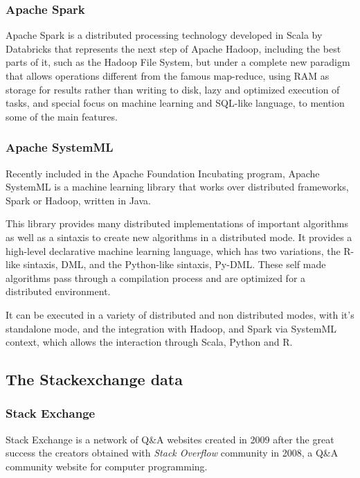 \documentclass[11pt]{article} %
\begin{document}
  \subsubsection{Apache Spark}

    Apache Spark is a distributed processing technology developed in Scala by Databricks that represents the next step of Apache Hadoop, including the best parts of it, such as the Hadoop File System, but under a complete new paradigm that allows operations different from the famous map-reduce, using RAM as storage for results rather than writing to disk, lazy and optimized execution of tasks, and special focus on machine learning and SQL-like language, to mention some of the main features.

  \subsubsection{Apache SystemML}

    Recently included in the Apache Foundation Incubating  program, Apache SystemML is a machine learning library that works over distributed frameworks, Spark or Hadoop, written in Java.

    This library provides many distributed implementations of important algorithms as well as a sintaxis to create new algorithms in a distributed mode. It provides a high-level declarative machine learning language, which has two variations, the R-like sintaxis, DML, and the Python-like sintaxis, Py-DML. These self made algorithms pass through a compilation process and are optimized for a distributed environment.

    It can be executed in a variety of distributed and non distributed modes, with it's standalone mode, and the integration with Hadoop, and Spark via SystemML context, which allows the interaction through Scala, Python and R.


  \subsection{The Stackexchange data}
  \label{subsec:data_structure}

    \subsubsection{Stack Exchange}

    Stack Exchange is a network of Q\&A websites created in 2009 after the great success the creators obtained with \emph{Stack Overflow} community in 2008, a Q\&A community website for computer programming.
\end{document}
